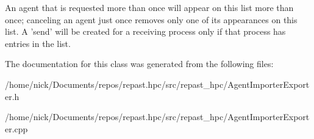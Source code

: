An agent that is requested more than once will appear on this list more than once; canceling an agent just once removes only one of its appearances on this list. A 'send' will be created for a receiving process only if that process has entries in the list. 

The documentation for this class was generated from the following files\-:\begin{DoxyCompactItemize}
\item 
/home/nick/\-Documents/repos/repast.\-hpc/src/repast\-\_\-hpc/Agent\-Importer\-Exporter.\-h\item 
/home/nick/\-Documents/repos/repast.\-hpc/src/repast\-\_\-hpc/Agent\-Importer\-Exporter.\-cpp\end{DoxyCompactItemize}
